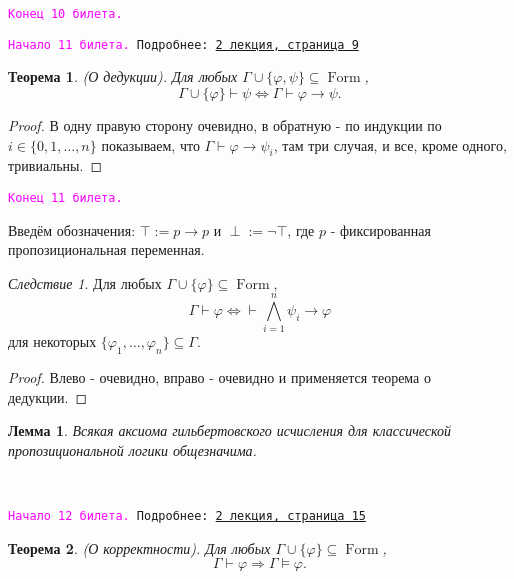 \documentclass[a4paper,100pt]{article}
\theoremstyle{indented}
\newtheorem{theorem}{Теорема}
\newtheorem{lemma}{Лемма}
\theoremstyle{definition}
\theoremstyle{remark}
\newtheorem{cons}{Следствие}
\DeclareMathOperator{\form}{Form}
\begin{document}
\texttt{\textcolor{magenta}{Конец 10 билета.}} 

\hrulefill

\texttt{\hypertarget{b11}{\textcolor{magenta}{Начало 11 билета.}} Подробнее: \href{http://www.mi-ras.ru/~speranski/courses/logic-1-2021-spring/slides_2.pdf}{2 лекция, страница 9}} \\

\begin{theorem}
  (О дедукции). Для любых $\Gamma \cup \{\varphi, \psi\}\subseteq \form$, 
  \[
    \Gamma \cup \{\varphi\}\vdash \psi \Longleftrightarrow \Gamma \vdash \varphi \rightarrow \psi. 
  \]
\end{theorem}

\begin{proof}
  В одну правую сторону очевидно, в обратную - по индукции по $i\in\{0, 1, \ldots, n\}$ показываем, что $\Gamma\vdash \varphi\rightarrow \psi_i$, там три случая, и все, кроме одного, тривиальны.
\end{proof}

\texttt{\textcolor{magenta}{Конец 11 билета.}} 

\hrulefill

Введём обозначения: $\top:= p\rightarrow p$ и $\perp := \neg \top$, где $p$ - фиксированная пропозициональная переменная.

\begin{cons}
  Для любых $\Gamma\cup \{\varphi\}\subseteq \form$, 
  \[
    \Gamma \vdash \varphi \Longleftrightarrow \vdash \bigwedge_{i=1}^n \psi_i\rightarrow \varphi
  \]
  для некоторых $\{\varphi_1, \ldots, \varphi_n\}\subseteq \Gamma$.
\end{cons}

\begin{proof}
  Влево - очевидно, вправо - очевидно и применяется теорема о дедукции.
\end{proof}

\begin{lemma}
  Всякая аксиома гильбертовского исчисления для классической пропозициональной логики общезначима.
\end{lemma}\ 

\hrulefill

\texttt{\hypertarget{b12}{\textcolor{magenta}{Начало 12 билета.}} Подробнее: \href{http://www.mi-ras.ru/~speranski/courses/logic-1-2021-spring/slides_2.pdf}{2 лекция, страница 15}} \\

\begin{theorem}
  (О корректности). Для любых $\Gamma \cup \{\varphi\}\subseteq \form$, 
  \[
    \Gamma \vdash \varphi \Longrightarrow \Gamma \vDash \varphi. 
  \]
\end{theorem}
\end{document}
